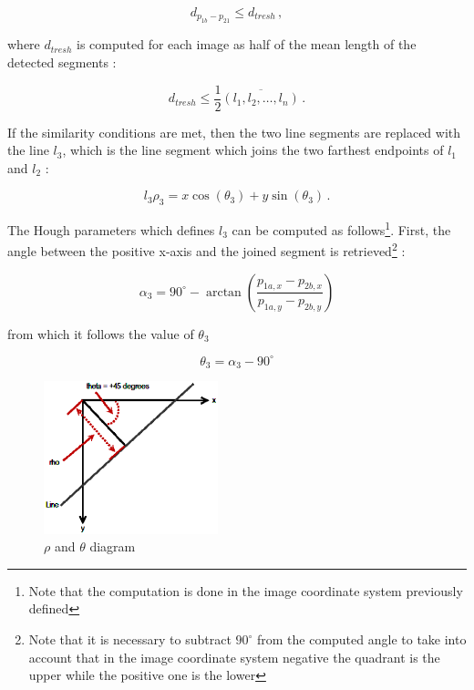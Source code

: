 \begin{equation}
d_{p_{1b}-p_{21}} \leqslant d_{tresh} \,,
\end{equation}

where $d_{tresh}$ is computed for each image as half of the mean length of the detected segments :

\begin{equation}
d_{tresh} \leqslant {\frac{1}{2}} \overline{(l_1, l_2,\ldots, l_n)} \,.
\end{equation}

If the similarity conditions are met, then the two line segments are replaced with the line $l_3$, which is the line segment which joins the two farthest endpoints of $l_1$ and $l_2$ :

\begin{equation}
l_3 \rho_3 = x \cos (\theta_3) +  y \sin (\theta_3) \,.
\end{equation}

The Hough parameters which defines $l_3$ can be computed as follows\footnote{Note that the computation is done in the image coordinate system previously defined}. First, the angle between the positive x-axis and the joined segment is retrieved\footnote{Note that it is necessary to subtract $90^{\circ}$ from the computed angle to take into account that in the image coordinate system negative the quadrant is the upper while the positive one is the lower} :

\begin{equation}
\alpha_3 = 90^{\circ} - \arctan{\left(\frac{p_{1a,x}-p_{2b,x}}{p_{1a,y}-p_{2b,y}}\right)}
\end{equation}

from which it follows the value of $\theta_3$

\begin{equation}
\theta_3 = \alpha_3 - 90^{\circ}
\end{equation}

\begin{figure}[htbp]
  \centering
  \includegraphics[width=0.45\textwidth]{gfx/hough_rho_theta_diagram.eps}
  \caption{$\rho$ and $\theta$ diagram}
  \label{fig:theposeproblem}
\end{figure}

